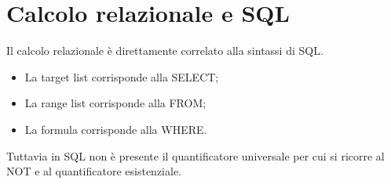 \section{Calcolo relazionale e SQL}

Il calcolo relazionale è direttamente correlato alla sintassi di SQL. 

\begin{itemize}
    \item La target list corrisponde alla SELECT;
    \item La range list corrisponde alla FROM;
    \item La formula corrisponde alla WHERE.
\end{itemize}

Tuttavia in SQL non è presente il quantificatore universale per cui si ricorre al NOT e al quantificatore esistenziale.